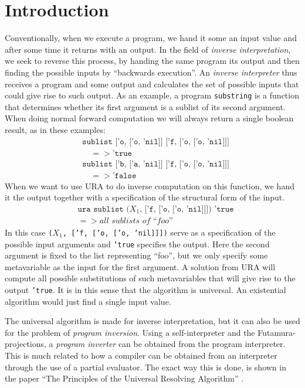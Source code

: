 \documentclass[10pt]{../sigplanconf}
\begin{document}
\section{Introduction}
Conventionally, when we execute a program, we hand it some an input
value and after some time it returns with an output. In the field of
\textit{inverse interpretation}, we seek to reverse this process, by
handing the same program its output and then finding the possible
inputs by ``backwards execution''. An \textit{inverse interpreter}
thus receives a program and some output and calculates the set of
possible inputs that could give rise to such output. As an example, a
program \texttt{substring} is a function that determines whether its
first argument is a sublist of its second argument. When doing normal
forward computation we will always return a single boolean result, as
in these examples:
\begin{align*}
& \texttt{sublist ['o, ['o, 'nil]] ['f, ['o, ['o, 'nil]]]} \\
& \quad => \texttt{'true} \\
& \texttt{sublist ['b, ['a, 'nil]] ['f, ['o, ['o, 'nil]]]} \\
& \quad => \texttt{'false}
\end{align*}
When we want to use URA to do inverse computation on this function, we
hand it the output together with a specification of the structural
form of the input.
\begin{align*}
  &\texttt{ura sublist ($X_1$, ['f, ['o, ['o, 'nil]]]) 'true} \\
  & => \textit{all sublists of ``foo''}
\end{align*}
In this case \texttt{($X_1$, ['f, ['o, ['o, 'nil]]])} serve as a
specification of the possible input arguments and \texttt{'true}
specifies the output. Here the second argument is fixed to the list
representing ``foo'', but we only specify some metavariable as the
input for the first argument. A solution from URA will compute all
possible substitutions of such metavariables that will give rise to
the output \texttt{'true}. It is in this sense that the algorithm is
universal. An existential algorithm would just find a single input
value.

The universal algorithm is made for inverse interpretation, but it can
also be used for the problem of \textit{program inversion}. Using a
self-interpreter and the Futamura-projections, a \textit{program
  inverter} can be obtained from the program interpreter. This is much
related to how a compiler can be obtained from an interpreter through
the use of a partial evaluator. The exact way this is done, is shown
in the paper ``The Principles of the Universal Resolving Algorithm''
\cite{abramov2000universal}.
\end{document}
